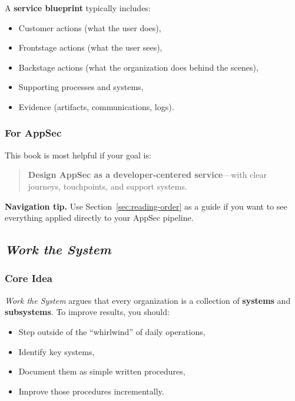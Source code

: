\documentclass[11pt]{article}
\begin{document}
A \textbf{service blueprint} typically includes:

\begin{itemize}
  \item Customer actions (what the user does),
  \item Frontstage actions (what the user sees),
  \item Backstage actions (what the organization does behind the scenes),
  \item Supporting processes and systems,
  \item Evidence (artifacts, communications, logs).
\end{itemize}

\subsubsection*{For AppSec}

This book is most helpful if your goal is:
\begin{quote}
  \textbf{Design AppSec as a developer-centered service}---with clear
  journeys, touchpoints, and support systems.
\end{quote}

\medskip

\textbf{Navigation tip.} Use Section~\ref{sec:reading-order} as a guide
if you want to see everything applied directly to your AppSec pipeline.

\subsection{\emph{Work the System}}
\subsubsection*{Core Idea}

\emph{Work the System} argues that every organization is a collection
of \textbf{systems} and \textbf{subsystems}.
To improve results, you should:
\begin{itemize}
  \item Step outside of the ``whirlwind'' of daily operations,
  \item Identify key systems,
  \item Document them as simple written procedures,
  \item Improve those procedures incrementally.
\end{itemize}
\end{document}
